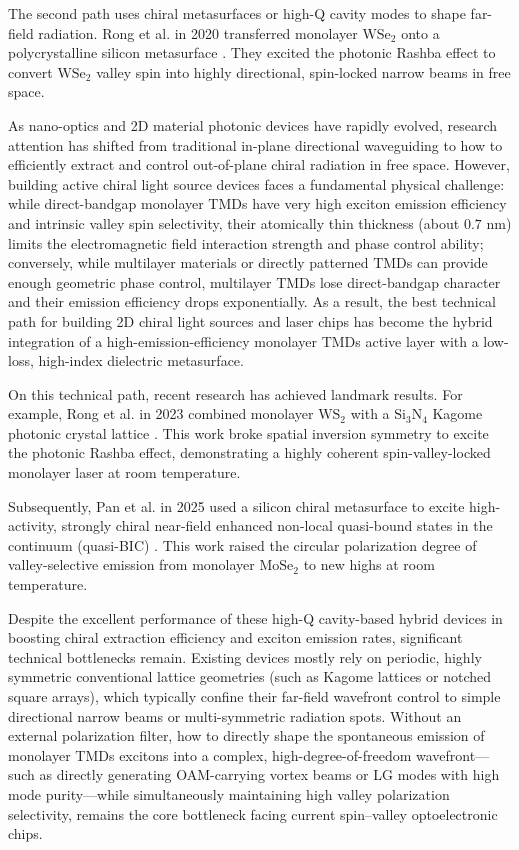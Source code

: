 The second path uses chiral metasurfaces or high-Q cavity modes to shape far-field radiation. Rong et al. in 2020 transferred monolayer $\text{WSe}_2$ onto a polycrystalline silicon metasurface \cite{rong2020photonic}. They excited the photonic Rashba effect to convert $\text{WSe}_2$ valley spin into highly directional, spin-locked narrow beams in free space.

As nano-optics and 2D material photonic devices have rapidly evolved, research attention has shifted from traditional in-plane directional waveguiding to how to efficiently extract and control out-of-plane chiral radiation in free space. However, building active chiral light source devices faces a fundamental physical challenge: while direct-bandgap monolayer TMDs have very high exciton emission efficiency and intrinsic valley spin selectivity, their atomically thin thickness (about $0.7\text{ nm}$) limits the electromagnetic field interaction strength and phase control ability; conversely, while multilayer materials or directly patterned TMDs can provide enough geometric phase control, multilayer TMDs lose direct-bandgap character and their emission efficiency drops exponentially. As a result, the best technical path for building 2D chiral light sources and laser chips has become the hybrid integration of a high-emission-efficiency monolayer TMDs active layer with a low-loss, high-index dielectric metasurface.

On this technical path, recent research has achieved landmark results. For example, Rong et al. in 2023 combined monolayer $\text{WS}_2$ with a $\text{Si}_3\text{N}_4$ Kagome photonic crystal lattice \cite{rong2023spin}. This work broke spatial inversion symmetry to excite the photonic Rashba effect, demonstrating a highly coherent spin-valley-locked monolayer laser at room temperature.

Subsequently, Pan et al. in 2025 used a silicon chiral metasurface to excite high-activity, strongly chiral near-field enhanced non-local quasi-bound states in the continuum (quasi-BIC) \cite{pan2025room}. This work raised the circular polarization degree of valley-selective emission from monolayer $\text{MoSe}_2$ to new highs at room temperature.

Despite the excellent performance of these high-Q cavity-based hybrid devices in boosting chiral extraction efficiency and exciton emission rates, significant technical bottlenecks remain. Existing devices mostly rely on periodic, highly symmetric conventional lattice geometries (such as Kagome lattices or notched square arrays), which typically confine their far-field wavefront control to simple directional narrow beams or multi-symmetric radiation spots. Without an external polarization filter, how to directly shape the spontaneous emission of monolayer TMDs excitons into a complex, high-degree-of-freedom wavefront---such as directly generating OAM-carrying vortex beams or LG modes with high mode purity---while simultaneously maintaining high valley polarization selectivity, remains the core bottleneck facing current spin--valley optoelectronic chips.

